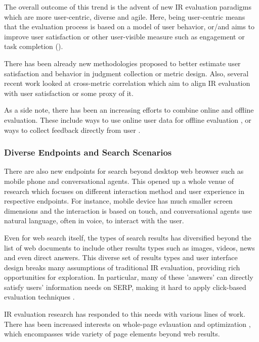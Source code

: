 \documentclass[openany]{now} %
\begin{document}
The overall outcome of this trend is the advent of new IR evaluation paradigms which are more user-centric, diverse and agile. Here, being user-centric means that the evaluation process is based on a model of user behavior, or/and aims to improve user satisfaction or other user-visible measure such as engagement or task completion (\cite{scholer13}). 

There has been already new methodologies proposed to better estimate user satisfaction and behavior in judgment collection \cite{VermaY16, VermaYC16} or metric design\cite{YilmazSCR10, CarteretteKY11, ChapelleMZG09}. Also, several recent work looked at cross-metric correlation \cite{Al-Maskari2007} \cite{radl:comp10} which aim to align IR evaluation with user satisfaction or some proxy of it.

As a side note, there has been an increasing efforts to combine online and offline evaluation. These include ways to use online user data for offline evaluation \cite{Li:2015} \cite{li2010contextual} \cite{chuklin2015click}, or ways to collect feedback directly from user \cite{Kim2016}.

\subsubsection{Diverse Endpoints and Search Scenarios}

There are also new endpoints for search beyond desktop web browser such as mobile phone and conversational agents. This opened up a whole venue of research which focuses on different interaction method and user experience in respective endpoints. For instance, mobile device has much smaller screen dimensions and the interaction is based on touch, and conversational agents use natural language, often in voice, to interact with the user.

Even for web search itself, the types of search results has diversified beyond the list of web documents to include other results types such as images, videos, news and even direct answers. This diverse set of results types and user interface design breaks many assumptions of traditional IR evaluation, providing rich opportunities for exploration. In particular, many of these 'answers' can directly satisfy users' information needs on SERP, making it hard to apply click-based evaluation techniques \cite{Li2009GA} \cite{diriye2012leaving}.

IR evaluation research has responded to this needs with various lines of work. There has been increased interests on whole-page evlauation and optimization \cite{Zhou:2012}, which encompasses wide variety of page elements beyond web results. %
\end{document}
